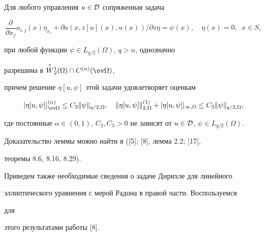 \begin{lems} 


Для любого управления $u\in\cal D$ сопряженная задача 


\begin{equation} 


\frac{\partial}{\partial x_j}a_{i,j}(x)\eta_{x_i}+ 


\partial a(x,z[u](x),u(x))/\partial z\eta= 


\psi(x),\quad \eta(x)=0,\ \; x\in S, 


\end{equation} 


при любой функции $\psi\in L_{q/2}(\Omega)$, $q>n$, однозначно 


разрешима в $\up{\circ}{W}^1_2(\Omega)\cap C^{(\alpha)}(\ov\Omega)$, 


причем решение $\eta[u,\psi]$ этой задачи удовлетворяет оценкам 


$$ 


|\eta[u,\psi]|^{(\alpha)}_{\ov\Omega}\le C_2\|\psi\|_{q/2,\Omega}, 


\quad \|\eta[u,\psi]\|^{(1)}_{2,\Omega}+ 


|\eta[u,\psi]|_{\infty,\Omega}\le C_3\|\psi\|_{q/2,\Omega}, 


$$ 


где постоянные $\alpha\in(0,1)$, $C_2,C_3>0$ не зависят от $u\in\cal 


D$, $\psi\in L_{q/2}(\Omega)$. 


\end{lems} 


 


Доказательство леммы можно найти в ([5]; [8], лемма 2.2; [17], 


теоремы 8.6, 8.16, 8.29). 


 


Приведем также необходимые сведения о задаче Дирихле для линейного 


эллиптического уравнения с мерой Радона в правой части. Воспользуемся 


для 


этого результатами работы [8]. 


 


